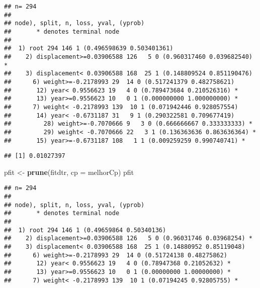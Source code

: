 \documentclass[]{article}
\newenvironment{Shaded}{\begin{snugshade}}{\end{snugshade}}
\newcommand{\KeywordTok}[1]{\textcolor[rgb]{0.13,0.29,0.53}{\textbf{#1}}}
\newcommand{\DataTypeTok}[1]{\textcolor[rgb]{0.13,0.29,0.53}{#1}}
\newcommand{\StringTok}[1]{\textcolor[rgb]{0.31,0.60,0.02}{#1}}
\newcommand{\OperatorTok}[1]{\textcolor[rgb]{0.81,0.36,0.00}{\textbf{#1}}}
\newcommand{\NormalTok}[1]{#1}
\begin{document}
\begin{verbatim}
## n= 294 
## 
## node), split, n, loss, yval, (yprob)
##       * denotes terminal node
## 
##  1) root 294 146 1 (0.496598639 0.503401361)  
##    2) displacement>=0.03906588 126   5 0 (0.960317460 0.039682540) *
##    3) displacement< 0.03906588 168  25 1 (0.148809524 0.851190476)  
##      6) weight>=-0.2178993 29  14 0 (0.517241379 0.482758621)  
##       12) year< 0.9556623 19   4 0 (0.789473684 0.210526316) *
##       13) year>=0.9556623 10   0 1 (0.000000000 1.000000000) *
##      7) weight< -0.2178993 139  10 1 (0.071942446 0.928057554)  
##       14) year< -0.6731187 31   9 1 (0.290322581 0.709677419)  
##         28) weight>=-0.7070666 9   3 0 (0.666666667 0.333333333) *
##         29) weight< -0.7070666 22   3 1 (0.136363636 0.863636364) *
##       15) year>=-0.6731187 108   1 1 (0.009259259 0.990740741) *
\end{verbatim}

\begin{Shaded}
\end{Shaded}

\begin{verbatim}
## [1] 0.01027397
\end{verbatim}

\begin{Shaded}
\begin{Highlighting}[]
\NormalTok{pfit <-}\StringTok{ }\KeywordTok{prune}\NormalTok{(fitdtr, }\DataTypeTok{cp =}\NormalTok{ melhorCp)}
\NormalTok{pfit}
\end{Highlighting}
\end{Shaded}

\begin{verbatim}
## n= 294 
## 
## node), split, n, loss, yval, (yprob)
##       * denotes terminal node
## 
##  1) root 294 146 1 (0.49659864 0.50340136)  
##    2) displacement>=0.03906588 126   5 0 (0.96031746 0.03968254) *
##    3) displacement< 0.03906588 168  25 1 (0.14880952 0.85119048)  
##      6) weight>=-0.2178993 29  14 0 (0.51724138 0.48275862)  
##       12) year< 0.9556623 19   4 0 (0.78947368 0.21052632) *
##       13) year>=0.9556623 10   0 1 (0.00000000 1.00000000) *
##      7) weight< -0.2178993 139  10 1 (0.07194245 0.92805755) *
\end{verbatim}
\end{document}
